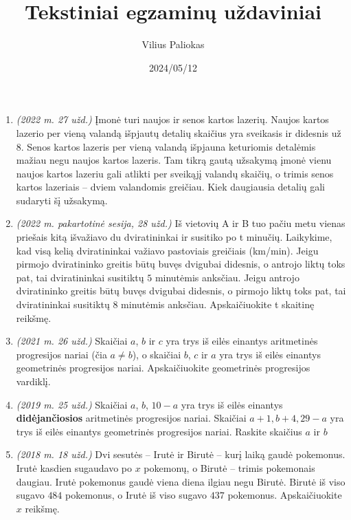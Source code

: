 \documentclass[a4paper]{article}
\title{Tekstiniai egzaminų uždaviniai}
\author{Vilius Paliokas}
\date{2024/05/12}
\begin{document}
\thispagestyle{fancy}

\titlespacing*{\subsection}{0pt}{.75ex}{0.75ex}

\begin{enumerate}
      \item \textit{(2022 m. 27 užd.)} Įmonė turi naujos ir senos kartos lazerių. Naujos kartos lazerio per vieną valandą išpjautų detalių
            skaičius yra sveikasis ir didesnis už $8$. Senos kartos lazeris per vieną valandą išpjauna keturiomis
            detalėmis mažiau negu naujos kartos lazeris. Tam tikrą gautą užsakymą įmonė vienu naujos kartos
            lazeriu gali atlikti per sveikąjį valandų skaičių, o trimis senos kartos lazeriais – dviem valandomis
            greičiau. Kiek daugiausia detalių gali sudaryti šį užsakymą.

      \item \textit{(2022 m. pakartotinė sesija, 28 užd.)} Iš vietovių A ir B tuo pačiu metu vienas priešais kitą išvažiavo du dviratininkai ir susitiko po
            t minučių. Laikykime, kad visą kelią dviratininkai važiavo pastoviais greičiais (km/min). Jeigu
            pirmojo dviratininko greitis būtų buvęs dvigubai didesnis, o antrojo liktų toks pat, tai dviratininkai
            susitiktų $5$ minutėmis anksčiau. Jeigu antrojo dviratininko greitis būtų buvęs dvigubai didesnis, o
            pirmojo liktų toks pat, tai dviratininkai susitiktų $8$ minutėmis anksčiau. Apskaičiuokite t skaitinę
            reikšmę.

      \item \textit{(2021 m. 26 užd.)} Skaičiai $a$, $b$ ir $c$ yra trys iš eilės einantys aritmetinės progresijos nariai (čia $a \neq b$), o
            skaičiai $b$, $c$ ir $a$ yra trys iš eilės einantys geometrinės progresijos nariai. Apskaičiuokite
            geometrinės progresijos vardiklį.

      \item \textit{(2019 m. 25 užd.)} Skaičiai $a$, $b$, $10-a$ yra trys iš eilės einantys \textbf{didėjančiosios} aritmetinės progresijos nariai.
            Skaičiai $a+1, b+4, 29-a$ yra trys iš eilės einantys geometrinės progresijos nariai. Raskite
            skaičius $a$ ir $b$

      \item \textit{(2018 m. 18 užd.)} Dvi sesutės – Irutė ir Birutė – kurį laiką gaudė pokemonus. Irutė kasdien sugaudavo po
            $x$ pokemonų, o Birutė – trimis pokemonais daugiau. Irutė pokemonus gaudė viena diena ilgiau
            negu Birutė. Birutė iš viso sugavo $484$ pokemonus, o Irutė iš viso sugavo $437$ pokemonus.
            Apskaičiuokite $x$ reikšmę.


\end{enumerate}
\end{document}
